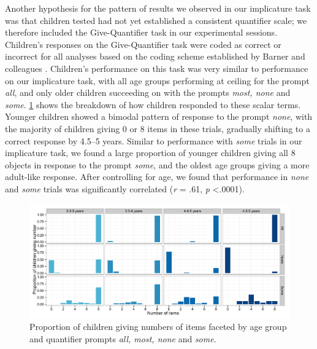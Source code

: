 \documentclass[man]{apa2}
\begin{document}
Another hypothesis for the pattern of results we observed in our implicature task was that children tested had not yet established a consistent quantifier scale; we therefore included the Give-Quantifier task in our experimental sessions. Children's responses on the Give-Quantifier task were coded as correct or incorrect for all analyses based on the coding scheme established by Barner and colleagues \cite{barner2009}. Children's performance on this task was very similar to performance on our implicature task, with all age groups performing at ceiling for the prompt \textit{all}, and only older children succeeding on with the prompts \textit{most, none} and \textit{some}. \ref{fig:GQ_spread} shows the breakdown of how children responded to these scalar terms. Younger children showed a bimodal pattern of response to the prompt \textit{none}, with the majority of children giving 0 or 8 items in these trials, gradually shifting to a correct response by 4.5--5 years. Similar to performance with \textit{some} trials in our implicature task, we found a large proportion of younger children giving all 8 objects in response to the prompt \textit{some}, and the oldest age groups giving a more adult-like response. After controlling for age, we found that performance in \emph{none} and \emph{some} trials was significantly correlated (\textit{r} = .61, \textit{p} \textless .0001). 

\begin{figure} 
 \begin{center} 
  \includegraphics[width = \textwidth]{figures/exp3_GQspread.pdf} 
  \caption{\label{fig:GQ_spread} Proportion of children giving numbers of items faceted by age group and quantifier prompts \textit{all, most, none} and \textit{some}.} 
 \end{center} 
\end{figure}
\end{document}
